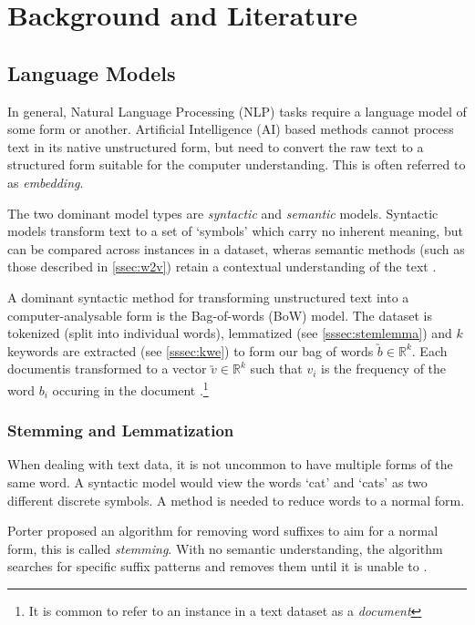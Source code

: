\section{Background and Literature}\label{sec:lit}

\subsection{Language Models}\label{ssec:kwe}
In general, Natural Language Processing (NLP) tasks require a language model of some form or another.
Artificial Intelligence (AI) based methods cannot process text in its native unstructured form, but need to convert the
raw text to a structured form suitable for the computer understanding. This is often referred to as \emph{embedding}.

The two dominant model types are \emph{syntactic} and \emph{semantic} models. 
Syntactic models transform text to a set of `symbols' which carry no inherent meaning, but can be 
compared across instances in a dataset, wheras semantic methods (such as those described in \autoref{ssec:w2v})
retain a contextual understanding of the text \cite{Cambria2014}.

A dominant syntactic method for transforming unstructured text into a computer-analysable form is the Bag-of-words 
(BoW) model. 
The dataset is tokenized (split into individual words), lemmatized (see \autoref{sssec:stemlemma})
and $k$ keywords are extracted (see \autoref{sssec:kwe}) to form our bag of words $\utilde{b}\in \mathbb{R} ^{k}$.
Each documentis
transformed to a vector $\utilde{v}\in \mathbb{R} ^{k}$ such that $v_i$ is the frequency 
of the word $b_i$ occuring in the document \cite{Cambria2014, StevenBirdEwanKlein2009, Zhang2010}.\footnote{It is common to refer to an instance in a text dataset as a \emph{document}}

\subsubsection{Stemming and Lemmatization}\label{sssec:stemlemma}
When dealing with text data, it is not uncommon to have multiple forms of the same word.  A syntactic model would view
the words `cat' and `cats' as two different discrete symbols.  A method is needed to reduce words to a normal form.

Porter proposed an algorithm for removing word suffixes to aim for a normal form, this is called
\emph{stemming}. With no semantic understanding, the algorithm searches for specific suffix patterns and removes them
until it is unable to \cite{Porter1980}.

